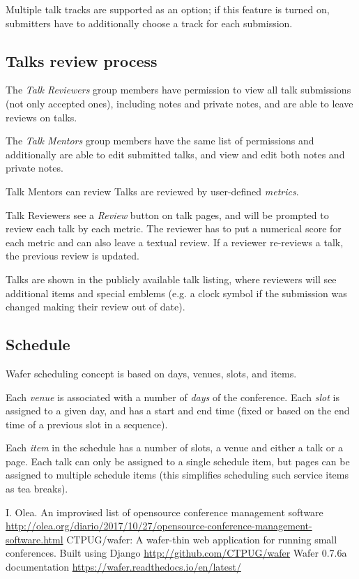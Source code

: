 \documentclass[10pt, a5paper]{article}
\begin{document}
Multiple talk tracks are supported as an option; if this feature is turned on, submitters have to additionally choose a track for each submission.

\subsection*{Talks review process}

The \emph{Talk Reviewers} group members have permission to view all talk submissions (not only accepted ones), including notes and private notes, and are able to leave reviews on talks.

The \emph{Talk Mentors} group members have the same list of permissions and additionally are able to edit submitted talks, and view and edit both notes and private notes.

Talk Mentors can review Talks are reviewed by user-defined \emph{metrics}.

Talk Reviewers see a \emph{Review} button on talk pages, and will be prompted to review each talk by each metric. The reviewer has to put a numerical score for each metric and can also leave a textual review. If a reviewer re-reviews a talk, the previous review is updated.

Talks are shown in the publicly available talk listing, where reviewers will see additional items and special emblems (e.g. a clock symbol if the submission was changed making their review out of date).

\subsection*{Schedule}

Wafer scheduling concept is based on days, venues, slots, and items.

Each \emph{venue} is associated with a number of \emph{days} of the conference. Each \emph{slot} is assigned to a given day, and has a start and end time (fixed or based on the end time of a previous slot in a sequence).

Each \emph{item} in the schedule has a number of slots, a venue and either a talk or a page. Each talk can only be assigned to a single schedule item, but pages can be assigned to multiple schedule items (this simplifies scheduling such service items as tea breaks).


\begin{thebibliography}{9}
 I. Olea. An improvised list of opensource conference management software \url{http://olea.org/diario/2017/10/27/opensource-conference-management-software.html}
 CTPUG/wafer: A wafer-thin web application for running small conferences. Built using Django \url{http://github.com/CTPUG/wafer}
 Wafer 0.7.6a documentation \url{https://wafer.readthedocs.io/en/latest/}
\end{thebibliography}
\end{document}
